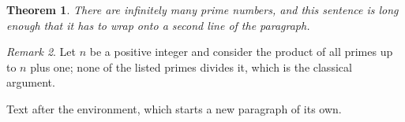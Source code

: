 \documentclass[12pt]{article}
\newtheorem{theorem}{Theorem}
\theoremstyle{remark}
\newtheorem{remark}[theorem]{Remark}
\begin{document}
\begin{theorem}
There are infinitely many prime numbers, and this sentence is long enough that it has to wrap onto a second line of the paragraph.
\end{theorem}
\begin{remark}
Let $n$ be a positive integer and consider the product of all primes up to $n$ plus one; none of the listed primes divides it, which is the classical argument.
\end{remark}
Text after the environment, which starts a new paragraph of its own.
\end{document}
